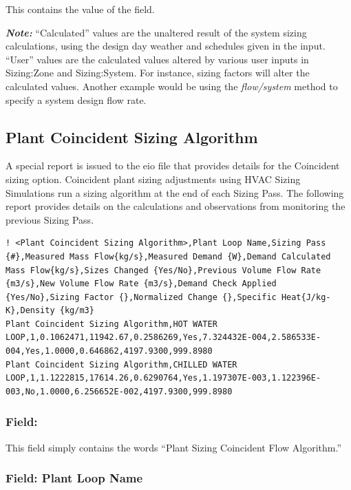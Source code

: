 This contains the value of the field.

\textbf{\emph{Note:}} ``Calculated'' values are the unaltered result of the system sizing calculations, using the design day weather and schedules given in the input. ``User'' values are the calculated values altered by various user inputs in Sizing:Zone and Sizing:System. For instance, sizing factors will alter the calculated values. Another example would be using the \emph{flow/system} method to specify a system design flow rate.

\subsection{Plant Coincident Sizing Algorithm}\label{plant-coincident-sizing-algorithm}

A special report is issued to the eio file that provides details for the Coincident sizing option. Coincident plant sizing adjustments using HVAC Sizing Simulations run a sizing algorithm at the end of each Sizing Pass. The following report provides details on the calculations and observations from monitoring the previous Sizing Pass.

\begin{lstlisting}
! <Plant Coincident Sizing Algorithm>,Plant Loop Name,Sizing Pass {#},Measured Mass Flow{kg/s},Measured Demand {W},Demand Calculated Mass Flow{kg/s},Sizes Changed {Yes/No},Previous Volume Flow Rate {m3/s},New Volume Flow Rate {m3/s},Demand Check Applied {Yes/No},Sizing Factor {},Normalized Change {},Specific Heat{J/kg-K},Density {kg/m3}
Plant Coincident Sizing Algorithm,HOT WATER LOOP,1,0.1062471,11942.67,0.2586269,Yes,7.324432E-004,2.586533E-004,Yes,1.0000,0.646862,4197.9300,999.8980
Plant Coincident Sizing Algorithm,CHILLED WATER LOOP,1,1.1222815,17614.26,0.6290764,Yes,1.197307E-003,1.122396E-003,No,1.0000,6.256652E-002,4197.9300,999.8980
\end{lstlisting}

\subsubsection{Field: }\label{field}

This field simply contains the words ``Plant Sizing Coincident Flow Algorithm.''

\subsubsection{Field: Plant Loop Name}\label{field-plant-loop-name}

